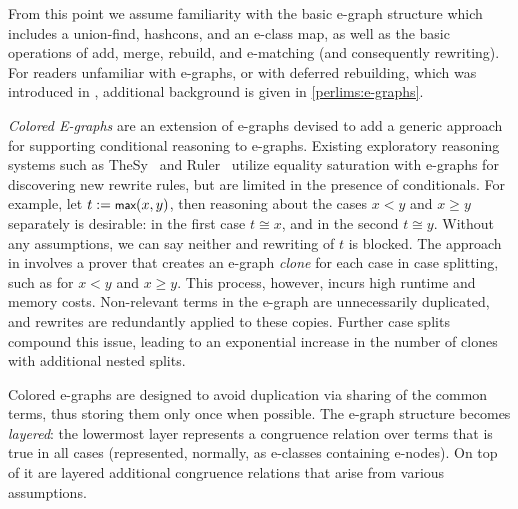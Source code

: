 From this point we assume familiarity with the basic e-graph structure which includes a union-find, hashcons, and an e-class map, as well as the basic operations of add, merge, rebuild, and e-matching (and consequently rewriting).
For readers unfamiliar with e-graphs, or with deferred rebuilding, which was introduced in \cite{egg}, additional background is given in  \autoref{perlims:e-graphs}.

\emph{Colored E-graphs} are an extension of e-graphs devised to add a generic approach for supporting conditional reasoning to e-graphs.
Existing exploratory reasoning systems such as TheSy~\cite{thesy} and Ruler~\cite{ruler} utilize equality saturation with e-graphs for discovering new rewrite rules, but are limited in the presence of conditionals.
For example, let $t := \tmax(x, y)$, then reasoning about the cases $x < y$ and $x \geq y$ separately is desirable: in the first case $t \cong x$, and in the second $t \cong y$.
Without any assumptions, we can say neither and rewriting of $t$ is blocked.
The approach in \cite{thesy} involves a prover that creates an e-graph \emph{clone} for each case in case splitting, such as for $x < y$ and $x \geq y$. 
This process, however, incurs high runtime and memory costs. 
Non-relevant terms in the e-graph are unnecessarily duplicated, and rewrites are redundantly applied to these copies. 
Further case splits compound this issue, leading to an exponential increase in the number of clones with additional nested splits.


Colored e-graphs are designed to avoid duplication via sharing of the common terms, thus storing them only once when possible.
The e-graph structure becomes \emph{layered}:
the lowermost layer represents a congruence relation over terms that is true in all cases (represented, normally, as e-classes containing e-nodes).
On top of it are layered additional congruence relations that arise from various assumptions.


